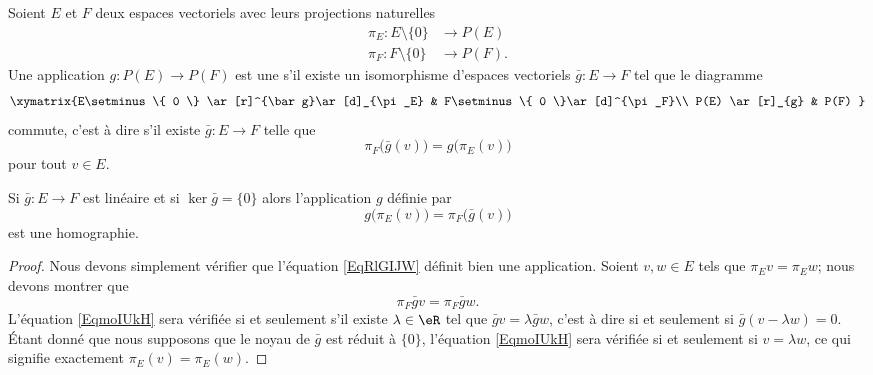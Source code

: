 \begin{definition}      \label{DEFooKWSMooXvOeEP}
    Soient \( E\) et \( F\) deux espaces vectoriels avec leurs projections naturelles
    \begin{subequations}
        \begin{align}
            \pi_E\colon E\setminus\{ 0 \}&\to P(E)\\
            \pi_F\colon F\setminus\{ 0 \}&\to P(F).
        \end{align}
    \end{subequations}
    Une application \( g\colon P(E)\to P(F)\) est une  s'il existe un isomorphisme d'espaces vectoriels \( \bar g\colon E\to F\) tel que le diagramme
    \begin{equation}
        \xymatrix{%
        E\setminus\{ 0 \} \ar[r]^{\bar g}\ar[d]_{\pi_E}        &   F\setminus\{ 0 \}\ar[d]^{\pi_F}\\
           P(E) \ar[r]_{g}   &   P(F)
           }
    \end{equation}
    commute, c'est à dire s'il existe \( \bar g\colon E\to F\) telle que
    \begin{equation}        \label{EQooSEFWooRpjLxt}
        \pi_F\big( \bar g(v) \big)=g\big( \pi_E(v) \big)
    \end{equation}
    pour tout \( v\in E\).
\end{definition}

\begin{lemma}
    Si \( \bar g\colon E\to F\) est linéaire et si \( \ker\bar g=\{ 0 \}\) alors l'application \( g\) définie par
    \begin{equation}        \label{EqRlGIJW}
        g\big( \pi_E(v) \big)=\pi_F\big( \bar g(v) \big)
    \end{equation}
    est une homographie.
\end{lemma}

\begin{proof}
    Nous devons simplement vérifier que l'équation \eqref{EqRlGIJW} définit bien une application. Soient \( v,w\in E\) tels que \( \pi_Ev=\pi_Ew\); nous devons montrer que 
    \begin{equation}        \label{EqmoIUkH}
        \pi_F\bar gv=\pi_F\bar gw.
    \end{equation}
    L'équation \eqref{EqmoIUkH} sera vérifiée si et seulement s'il existe \( \lambda\in\eR\) tel que \( \bar gv=\lambda\bar gw\), c'est à dire si et seulement si \( \bar g(v-\lambda w)=0\). Étant donné que nous supposons que le noyau de \( \bar g\) est réduit à \( \{ 0 \}\), l'équation \eqref{EqmoIUkH} sera vérifiée si et seulement si \( v=\lambda w\), ce qui signifie exactement \( \pi_E(v)=\pi_E(w)\).
\end{proof}

